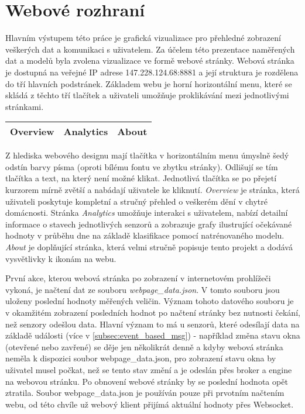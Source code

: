 \chapter{Webové rozhraní} \label{chap:web_page}

Hlavním výstupem této práce je grafická vizualizace pro přehledné zobrazení veškerých dat a komunikaci s uživatelem. Za účelem této prezentace naměřených dat a modelů byla zvolena vizualizace ve formě webové stránky. Webová stránka je dostupná na veřejné IP adrese 147.228.124.68:8881 a její struktura je rozdělena do tří hlavních podstránek. Základem webu je horní horizontální menu, které se skládá z těchto tří tlačítek a uživateli umožňuje proklikávání mezi jednotlivými stránkami.

\begin{table}[h!]
\centering
\begin{tabular}{|P{2.5cm}|P{2.5cm}|P{2.5cm}|} 
 \hline
 Overview & Analytics & About \\
 \hline
\end{tabular}
\end{table}

Z hlediska webového designu mají tlačítka v horizontálním menu úmyslně šedý odstín barvy písma (oproti bílému fontu ve zbytku stránky). Odlišují se tím tlačítka a text, na který není možné klikat. Jednotlivá tlačítka se po přejetí kurzorem mírně zvětší a nabádají uživatele ke kliknutí. \textit{Overview} je stránka, která uživateli poskytuje kompletní a stručný přehled o veškerém dění v chytré domácnosti. Stránka \textit{Analytics} umožňuje interakci s uživatelem, nabízí detailní informace o stavech jednotlivých senzorů a zobrazuje grafy ilustrující očekávané hodnoty v průběhu dne na základě klasifikace pomocí natrénovaného modelu. \textit{About} je doplňující stránka, která velmi stručně popisuje tento projekt a dodává vysvětlivky k ikonám na webu. \par
První akce, kterou webová stránka po zobrazení v internetovém prohlížeči vykoná, je načtení dat ze souboru \textit{webpage\_data.json}. V tomto souboru jsou uloženy poslední hodnoty měřených veličin. Význam tohoto datového souboru je v okamžitém zobrazení posledních hodnot po načtení stránky bez nutnosti čekání, než senzory odešlou data. Hlavní význam to má u senzorů, které odesílají data na základě události (více v \cref{subsec:event_based_msg}) - například změna stavu okna (otevřené nebo zavřené) se děje jen několikrát denně a kdyby webová stránka neměla k dispozici soubor webpage\_data.json, pro zobrazení stavu okna by uživatel musel počkat, než se tento stav změní a je odeslán přes broker a engine na webovou stránku. Po obnovení webové stránky by se poslední hodnota opět ztratila. Soubor webpage\_data.json je používán pouze při prvotním načtením webu, od této chvíle už webový klient přijímá aktuální hodnoty přes Websocket.  

